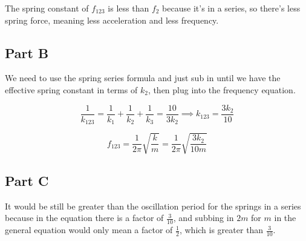 \documentclass{article}
\begin{document}
The spring constant of $f_{123}$ is less than $f_{2}$ because it's in a series, so there's less spring force, meaning less acceleration and less frequency.

\subsection {Part B}

We need to use the spring series formula and just sub in until we have the effective spring constant in terms of $k_2$, then plug into the frequency equation.

$$
\frac{1}{k_{123}}=\frac{1}{k_1}+\frac{1}{k_2}+\frac{1}{k_3} = \frac{10}{3 k_2} \implies k_{123} = \frac{3k_2}{10}
$$

$$
f_{123} = \frac{1}{2\pi}\sqrt{\frac{k}{m}} = \frac{1}{2\pi}\sqrt{\frac{3k_2}{10m}}
$$

\subsection {Part C}

It would be still be greater than the oscillation period for the springs in a series because in the equation there is a factor of $\frac{3}{10}$, and subbing in $2m$ for $m$ in the general equation would only mean a factor of $\frac{1}{2}$, which is greater than $\frac{3}{10}$.
\end{document}
